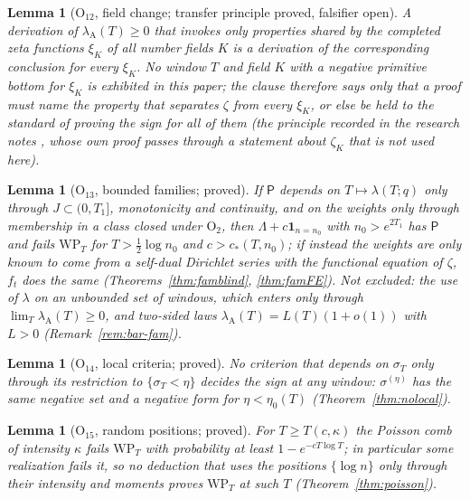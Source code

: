 \documentclass[11pt]{amsart}
\newtheorem{lemma}[theorem]{Lemma}
\theoremstyle{definition}
\theoremstyle{remark}
\newcommand{\lamA}{\lambda_{\mathrm A}(T)}
\newcommand{\sT}{\sigma_T}
\begin{document}
\begin{lemma}[$\mathrm O_{12}$, field change; transfer principle proved, falsifier open]\label{lem:shape-field}
A derivation of $\lamA\ge0$ that invokes only properties shared by the completed zeta functions $\xi_K$ of all number fields $K$ is a
derivation of the corresponding conclusion for every $\xi_K$. No window $T$ and field $K$ with a negative primitive bottom for $\xi_K$
is exhibited in this paper; the clause therefore says only that a proof must name the property that separates $\zeta$ from every
$\xi_K$, or else be held to the standard of proving the sign for all of them (the principle recorded in the research notes \cite[Thm.~18.1]{Paper46}, whose own
proof passes through a statement about $\zeta_K$ that is not used here).
\end{lemma}

\begin{lemma}[$\mathrm O_{13}$, bounded families; proved]\label{lem:shape-fam}
If $\mathsf P$ depends on $T\mapsto\lambda(T;q)$ only through $J\subset(0,T_1]$, monotonicity and continuity, and on the weights only
through membership in a class closed under $\mathrm O_2$, then $\Lambda+c\mathbf 1_{n=n_0}$ with $n_0>e^{2T_1}$ has $\mathsf P$ and fails
$\mathrm{WP}_T$ for $T>\frac12\log n_0$ and $c>c_*(T,n_0)$; if instead the weights are only known to come from a self-dual Dirichlet
series with the functional equation of $\zeta$, $f_t$ does the same (Theorems~\ref{thm:famblind}, \ref{thm:famFE}). Not excluded: the use
of $\lambda$ on an unbounded set of windows, which enters only through $\lim_T\lamA\ge0$, and two-sided laws $\lamA=L(T)(1+o(1))$
with $L>0$ (Remark~\ref{rem:bar-fam}).
\end{lemma}

\begin{lemma}[$\mathrm O_{14}$, local criteria; proved]\label{lem:shape-local}
No criterion that depends on $\sT$ only through its restriction to $\{\sT<\eta\}$ decides the sign at any window: $\sigma^{(\eta)}$ has the
same negative set and a negative form for $\eta<\eta_0(T)$ (Theorem~\ref{thm:nolocal}).
\end{lemma}

\begin{lemma}[$\mathrm O_{15}$, random positions; proved]\label{lem:shape-poisson}
For $T\ge T(c,\kappa)$ the Poisson comb of intensity $\kappa$ fails $\mathrm{WP}_T$ with probability at least $1-e^{-cT\log T}$; in
particular some realization fails it, so no deduction that uses the positions $\{\log n\}$ only through their intensity and moments proves
$\mathrm{WP}_T$ at such $T$ (Theorem~\ref{thm:poisson}).
\end{lemma}
\end{document}
